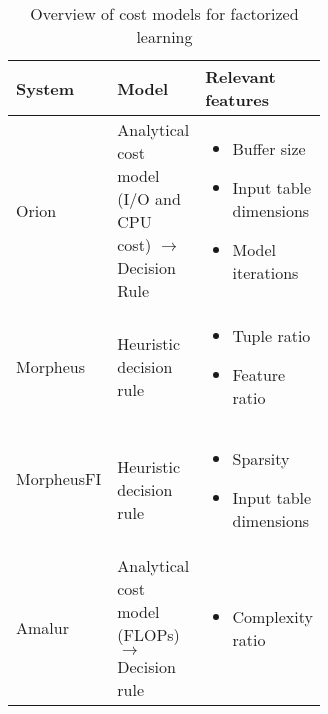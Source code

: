 \begin{table}[ht]
  \centering
  \begin{tabular}{lp{0.30\linewidth}p{0.32\linewidth}}
    \toprule
    System                                          & Model                                                                & Relevant features                                                                                                                           \\ \midrule \midrule
    Orion     ~\cite{orion_learning_gen_lin_models} & Analytical cost model (I/O and CPU cost) $\rightarrow$ Decision Rule & \begin{itemize}[noitemsep,topsep=0pt,leftmargin=0.3cm] \item Buffer size \item Input table dimensions \item Model iterations  \end{itemize} \\ \midrule
    Morpheus   ~\cite{morpheus}                     & Heuristic decision rule                                              & \begin{itemize}[noitemsep,topsep=0pt,leftmargin=0.3cm] \item Tuple ratio \item Feature ratio  \end{itemize}                                 \\\midrule
    MorpheusFI ~\cite{MorpheusFI}                   & Heuristic decision rule                                              & \begin{itemize}[noitemsep,topsep=0pt,leftmargin=0.3cm] \item Sparsity \item Input table dimensions \end{itemize}                            \\\midrule
    Amalur    ~\cite{amalur_tkde24}                 & Analytical cost model (FLOPs) $\rightarrow$ Decision rule            & \begin{itemize}[noitemsep,topsep=0pt,leftmargin=00.3cm] \item Complexity ratio \end{itemize}                                                \\
    \bottomrule
  \end{tabular}
  \caption{Overview of cost models for factorized learning}
  \label{tab:cost_model_overview}
\end{table}

